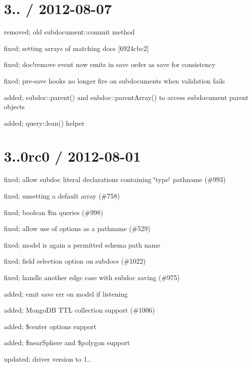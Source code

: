\section*{3.. / 2012-\/08-\/07 }


\begin{DoxyItemize}
\item removed; old subdocument\+::commit method
\item fixed; setting arrays of matching docs \mbox{[}6924cbc2\mbox{]}
\item fixed; doc!remove event now emits in save order as save for consistency
\item fixed; pre-\/save hooks no longer fire on subdocuments when validation fails
\item added; subdoc\+::parent() and subdoc\+::parent\+Array() to access subdocument parent objects
\item added; query\+::lean() helper
\end{DoxyItemize}

\section*{3..\+0rc0 / 2012-\/08-\/01 }


\begin{DoxyItemize}
\item fixed; allow subdoc literal declarations containing \char`\"{}type\char`\"{} pathname (\#993)
\item fixed; unsetting a default array (\#758)
\item fixed; boolean \$in queries (\#998)
\item fixed; allow use of {\ttfamily options} as a pathname (\#529)
\item fixed; {\ttfamily model} is again a permitted schema path name
\item fixed; field selection option on subdocs (\#1022)
\item fixed; handle another edge case with subdoc saving (\#975)
\item added; emit save err on model if listening
\item added; Mongo\+DB T\+TL collection support (\#1006)
\item added; \$center options support
\item added; \$near\+Sphere and \$polygon support
\item updated; driver version to 1..
\end{DoxyItemize}

